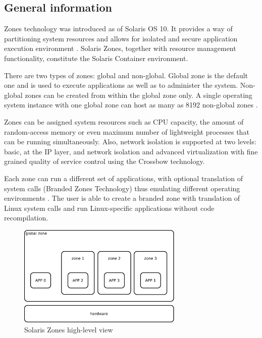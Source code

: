 \documentclass[11pt]{book}
\begin{document}
      \subsection{General information}
      \label{sub:}

        Zones technology was introduced as of Solaris OS 10. It provides a way of partitioning system resources and
        allows for isolated and secure application execution environment \cite{sag}. Solaris Zones, together with
        resource management functionality, constitute the Solaris Container environment.

        There are two types of zones: global and non-global. Global zone is the default one and is used to execute
        applications as well as to administer the system. Non-global zones can be created from within the global zone
        only. A single operating system instance with one global zone can host as many as 8192 non-global zones
        \cite{sag}.

        Zones can be assigned system resources such as CPU capacity, the amount of random-access memory or even maximum
        number of lightweight processes that can be running simultaneously. Also, network isolation is supported at two
        levels: basic, at the IP layer, and network isolation and advanced virtualization with fine grained quality of
        service control using the Crossbow technology.

        Each zone can run a different set of applications, with optional translation of system calls (Branded Zones
        Technology) thus emulating different operating environments \cite{sag}. The user is able to create a branded
        zone with translation of Linux system calls and run Linux-specific applications without code recompilation.

        \begin{figure}[H]
          \begin{center}
            \includegraphics[width=0.7\textwidth]{img/solaris/zones-high-level.pdf}
          \end{center}

          \caption{Solaris Zones high-level view}
        \end{figure}
\end{document}
